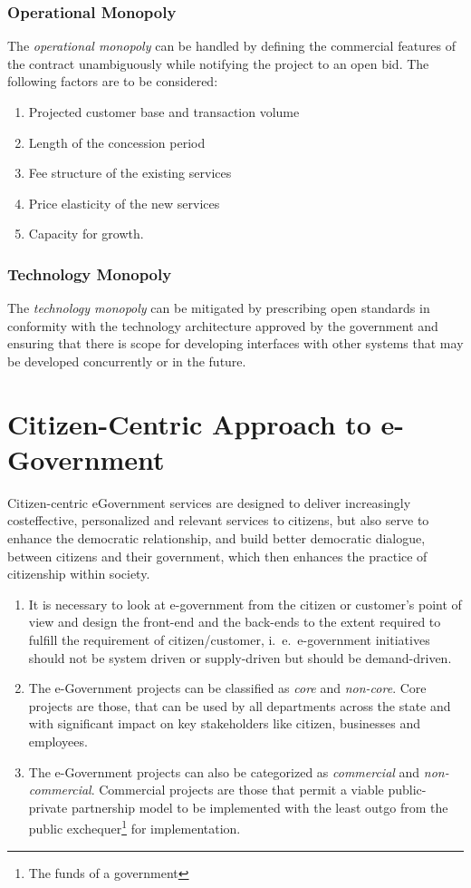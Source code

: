 \subsubsection*{Operational Monopoly}
The \textit{operational monopoly} can be handled by defining the commercial features of the contract unambiguously while notifying the project to an open bid. The following factors are to be considered:
\begin{enumerate}
	\item Projected customer base and transaction volume
	\item Length of the concession period
	\item Fee structure of the existing services
	\item Price elasticity of the new services
	\item Capacity for growth.
\end{enumerate}

\subsubsection*{Technology Monopoly}
The \textit{technology monopoly} can be mitigated by prescribing open standards in conformity with the technology architecture approved by the government and ensuring that there is scope for developing interfaces with other systems that may be developed concurrently or in the future.

\section{Citizen-Centric Approach to e-Government}
Citizen-centric eGovernment services are designed to deliver increasingly costeffective, personalized and relevant services to citizens, but also serve to enhance
the democratic relationship, and build better democratic dialogue, between citizens
and their government, which then enhances the practice of citizenship within
society.

\begin{enumerate}
	\item It is necessary to look at e-government from the citizen or customer’s point of view and design the front-end and the back-ends to the extent required to fulfill the requirement of citizen/customer, i.\ e.\ e-government initiatives should not be system driven or supply-driven but should be demand-driven.
	
	\item The e-Government projects can be classified as \textit{core} and \textit{non-core}. Core projects are those, that can be used by all departments across the state and with significant impact on key stakeholders like citizen, businesses and employees.
	
	\item The e-Government projects  can also be categorized as \textit{commercial} and \textit{non-commercial}. Commercial projects are those that permit a viable public-private partnership model to be implemented with the least outgo from the public exchequer\footnote{The funds of a government} for implementation.
\end{enumerate}

\newpage\thispagestyle{empty}